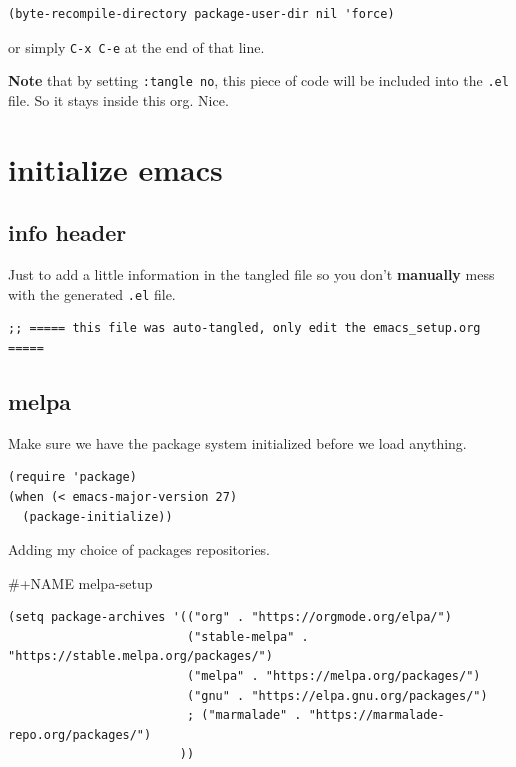 \documentclass[11pt]{article}
\begin{document}
\begin{verbatim}
(byte-recompile-directory package-user-dir nil 'force)
\end{verbatim}

or simply \texttt{C-x C-e} at the end of that line.

\textbf{Note} that by setting \texttt{:tangle no}, this piece of code will be included
into the \texttt{.el} file. So it stays inside this org. Nice.

\section{initialize emacs}
\label{sec:org88e1d04}

\subsection{info header}
\label{sec:org7070636}

Just to add a little information in the tangled file so you don't
\textbf{manually} mess with the generated \texttt{.el} file.

\begin{verbatim}
;; ===== this file was auto-tangled, only edit the emacs_setup.org =====
\end{verbatim}

\subsection{melpa}
\label{sec:orgf961fcc}

Make sure we have the package system initialized before we load anything.

\begin{verbatim}
(require 'package)
(when (< emacs-major-version 27)
  (package-initialize))
\end{verbatim}

Adding my choice of packages repositories.

\#+NAME melpa-setup
\begin{verbatim}
(setq package-archives '(("org" . "https://orgmode.org/elpa/")
                         ("stable-melpa" . "https://stable.melpa.org/packages/")
                         ("melpa" . "https://melpa.org/packages/")
                         ("gnu" . "https://elpa.gnu.org/packages/")
                         ; ("marmalade" . "https://marmalade-repo.org/packages/")
                        ))
\end{verbatim}
\end{document}
